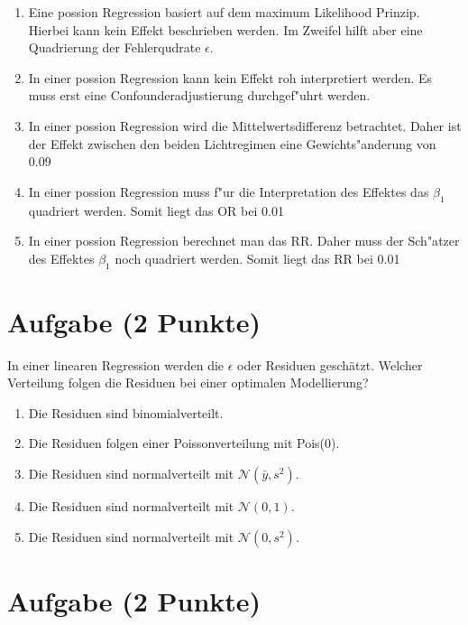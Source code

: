 \documentclass[a4paper, 10pt]{scrartcl}\usepackage[]{graphicx}\usepackage[]{color}
\begin{document}
\begin{enumerate}
\item [\textbf{A} \msquare] Eine possion Regression basiert auf dem maximum Likelihood Prinzip. Hierbei kann kein Effekt beschrieben werden. Im Zweifel hilft aber eine Quadrierung der Fehlerqudrate $\epsilon$.
\item [\textbf{B} \msquare] In einer possion Regression kann kein Effekt roh interpretiert werden. Es muss erst eine Confounderadjustierung durchgef{"u}hrt werden.
\item [\textbf{C} \msquare] In einer possion Regression wird die Mittelwertsdifferenz betrachtet. Daher ist der Effekt zwischen den beiden Lichtregimen eine Gewichts{"a}nderung von 0.09
\item [\textbf{D} \msquare] In einer possion Regression muss f{"u}r die Interpretation des Effektes das $\beta_1$ quadriert werden. Somit liegt das OR bei 0.01
\item [\textbf{E} \msquare] In einer possion Regression berechnet man das RR. Daher muss der Sch{"a}tzer des Effektes $\beta_1$ noch quadriert werden. Somit liegt das RR bei 0.01
\end{enumerate}

\section{Aufgabe \hfill (2 Punkte)}

In einer linearen Regression werden die $\epsilon$ oder Residuen
gesch{\"a}tzt. Welcher Verteilung folgen die Residuen bei einer optimalen
Modellierung? 



\begin{enumerate}
\item [\textbf{A} \msquare] Die Residuen sind binomialverteilt.
\item [\textbf{B} \msquare] Die Residuen folgen einer Poissonverteilung mit Pois(0).
\item [\textbf{C} \msquare] Die Residuen sind normalverteilt mit $\mathcal{N}(\bar{y}, s^2)$.
\item [\textbf{D} \msquare] Die Residuen sind normalverteilt mit $\mathcal{N}(0, 1)$.
\item [\textbf{E} \msquare] Die Residuen sind normalverteilt mit $\mathcal{N}(0, s^2)$.
\end{enumerate}

\section{Aufgabe \hfill (2 Punkte)}
\end{document}
